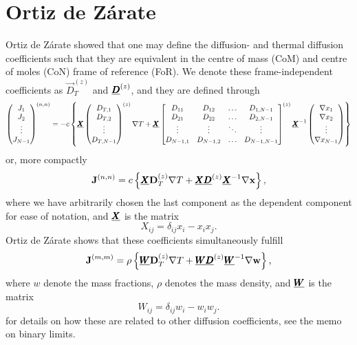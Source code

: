 \section{Ortiz de Zárate}

Ortiz de Zárate showed that one may define the diffusion- and thermal diffusion coefficients such that they are equivalent in the centre of mass (CoM) and centre of moles (CoN) frame of reference (FoR). We denote these frame-independent coefficients as $\Vec{D}_T^{(z)}$ and $\underline{\pmb{D}}^{(z)}$, and they are defined through
\begin{equation}
    \begin{pmatrix}J_1 \\ J_2 \\ \vdots \\ J_{N-1} \end{pmatrix}^{(n, n)} = - c\left\{
    \underline{\pmb{X}}
    \begin{pmatrix}
    D_{T,1} \\ D_{T,2} \\ \vdots \\ D_{T,N-1}    
    \end{pmatrix}^{(z)} \nabla T +
    \underline{\pmb{X}}
    \begin{bmatrix}
    D_{11} & D_{12} & \hdots & D_{1,N-1} \\
    D_{21} & D_{22} & \hdots & D_{2,N-1} \\
    \vdots & \vdots & \ddots & \vdots \\
    D_{N-1,1} & D_{N-1,2} & \hdots & D_{N-1,N-1}
    \end{bmatrix}^{(z)}
    \underline{\pmb{X}}^{-1}
    \begin{pmatrix}\nabla x_1 \\ \nabla x_2 \\ \vdots \\ \nabla x_{N-1} \end{pmatrix}
    \right\}
    \label{eq:zarate_definition}
\end{equation}
or, more compactly
\begin{equation}
    \boldsymbol{\mathrm{J}}^{(n, n)} = c \left\{ \underline{\pmb{X}} \boldsymbol{\mathrm{D}}_T^{(z)} \nabla T + \underline{\pmb{X}} \underline{\pmb{D}}^{(z)} \underline{\pmb{X}}^{-1} \nabla \boldsymbol{\mathrm{x}} \right\},
\end{equation}
where we have arbitrarily chosen the last component as the dependent component for ease of notation, and $\underline{\pmb{X}}$ is the matrix
\begin{equation}
    X_{ij} = \delta_{ij} x_i - x_i x_j.
\end{equation}
Ortiz de Zárate shows that these coefficients simultaneously fulfill
\begin{equation}
    \boldsymbol{\mathrm{J}}^{(m, m)} = \rho \left\{ \underline{\pmb{W}} \boldsymbol{\mathrm{D}}_T^{(z)} \nabla T + \underline{\pmb{W}} \underline{\pmb{D}}^{(z)} \underline{\pmb{W}}^{-1} \nabla \boldsymbol{\mathrm{w}} \right\},
\end{equation}
where $w$ denote the mass fractions, $\rho$ denotes the mass density, and $\underline{\pmb{W}}$ is the matrix
\begin{equation}
    W_{ij} = \delta_{ij} w_i - w_i w_j.
\end{equation}
for details on how these are related to other diffusion coefficients, see the memo on binary limits.

